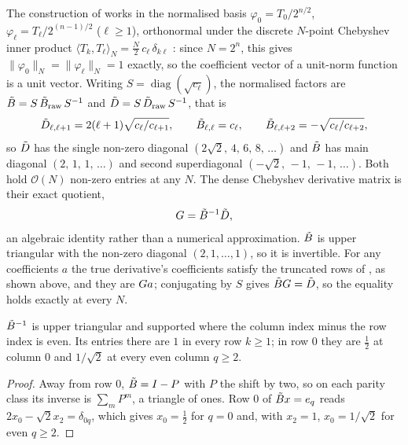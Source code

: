 The construction of  works in the normalised basis
$\varphi_0 = T_0 / 2^{n/2}$, $\varphi_\ell = T_\ell / 2^{(n-1)/2}$ ($\ell \ge 1$), orthonormal
under the discrete $N$-point Chebyshev inner product $\langle T_k, T_\ell \rangle_N =
\tfrac{N}{2}\,c_\ell\,\delta_{k\ell}$ \cite{trefethen2000spectral}: since $N = 2^n$, this gives
$\|\varphi_0\|_N = \|\varphi_\ell\|_N = 1$ exactly, so the coefficient vector of a unit-norm
function is a unit vector. Writing
$S = \operatorname{diag}(\sqrt{c_\ell})$, the normalised factors are
$\tilde{B} = S\,\tilde{B}_{\mathrm{raw}}\,S^{-1}$ and
$\tilde{D} = S\,\tilde{D}_{\mathrm{raw}}\,S^{-1}$, that is
\begin{equation}
    \tilde{D}_{\ell,\ell+1} = 2(\ell+1)\sqrt{c_\ell / c_{\ell+1}} , \qquad
    \tilde{B}_{\ell,\ell} = c_\ell , \qquad
    \tilde{B}_{\ell,\ell+2} = -\sqrt{c_\ell / c_{\ell+2}} ,
    \label{eq:app-normalised-entries}
\end{equation}
so $\tilde{D}$ has the single non-zero diagonal $(2\sqrt{2},\, 4,\, 6,\, 8,\, \dots)$
and $\tilde{B}$ has main diagonal $(2,\, 1,\, 1,\, \dots)$ and second superdiagonal
$(-\sqrt{2},\, -1,\, -1,\, \dots)$. Both hold $\mathcal{O}(N)$ non-zero entries at
any $N$. The dense Chebyshev derivative matrix is their exact quotient,
\begin{equation}
    G = \tilde{B}^{-1}\tilde{D} ,
\end{equation}
an algebraic identity rather than a numerical approximation. $\tilde{B}$ is upper triangular with the non-zero diagonal $(2,1,\dots,1)$, so it is invertible. For any coefficients $a$ the true derivative's coefficients satisfy the truncated rows of , as shown above, and they are $G a$; conjugating by $S$ gives $\tilde{B}G=\tilde{D}$, so the equality holds exactly at every $N$.

\begin{proposition}
\label{prop:Bt-inverse}
$\tilde{B}^{-1}$ is upper triangular and supported where the column index minus the row index is even. Its entries there are $1$ in every row $k\ge1$; in row $0$ they are $\tfrac12$ at column $0$ and $1/\sqrt2$ at every even column $q\ge2$.
\end{proposition}
\begin{proof}
Away from row $0$, $\tilde{B}=I-P$ with $P$ the shift by two, so on each parity class its inverse is $\sum_mP^m$, a triangle of ones. Row $0$ of $\tilde{B} x=e_q$ reads $2x_0-\sqrt2x_2=\delta_{0q}$, which gives $x_0=\tfrac12$ for $q=0$ and, with $x_2=1$, $x_0=1/\sqrt2$ for even $q\ge2$.
\end{proof}

